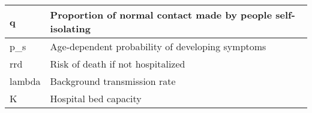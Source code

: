 \begin{table}[tb!]
{\begin{tabular}{|l|l|}
            \hline
            q             & Proportion of normal contact made by people self-isolating                 \\
            \hline
            p\_s          & Age-dependent probability of developing symptoms                           \\
            \hline
            rrd           & Risk of death if not hospitalized                                          \\
            \hline
            lambda        & Background transmission rate                                               \\
            \hline
            K             & Hospital bed capacity                                                      \\
            \hline
        \end{tabular}
    }
\end{table}

